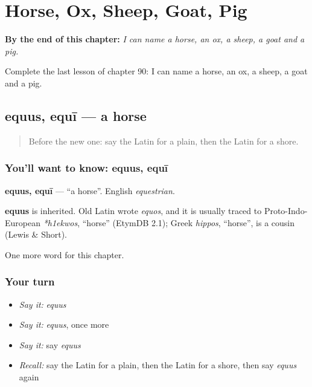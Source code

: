 
\chapter{Horse, Ox, Sheep, Goat, Pig}
\label{ch:la-horse-ox-sheep-goat-pig}

\begin{chapteropening}
\textbf{By the end of this chapter:} \emph{I can name a horse, an ox, a sheep, a goat and a pig.}

Complete the last lesson of chapter 90: I can name a horse, an ox, a sheep, a goat and a pig.
\end{chapteropening}

\section[equus, equī]{equus, equī — a horse}

\label{lesson:LA-C90-equus}



\begin{quote}
Before the new one: say the Latin for a plain, then the Latin for a shore.
\end{quote}

\subsection*{You'll want to know: equus, equī}
\textbf{equus, equī} — \textquotedblleft{}a horse\textquotedblright{}. English \emph{equestrian}.

\begin{cousinweb}
\textbf{equus} is inherited. Old Latin wrote \emph{equos}, and it is usually traced to Proto-Indo-European \emph{*h1ekwos}, \textquotedblleft{}horse\textquotedblright{} (EtymDB 2.1); Greek \emph{hippos}, \textquotedblleft{}horse\textquotedblright{}, is a cousin (Lewis \& Short).
\end{cousinweb}

\begin{grammarlens}[title={What you've built}]
One more word for this chapter.
\end{grammarlens}

\subsection*{Your turn}
\begin{itemize}
\raggedright
  \item \emph{Say it:} \emph{equus}
  \item \emph{Say it:} \emph{equus}, once more
  \item \emph{Say it:} say \emph{equus}
  \item \emph{Recall:} say the Latin for a plain, then the Latin for a shore, then say \emph{equus} again
\end{itemize}

